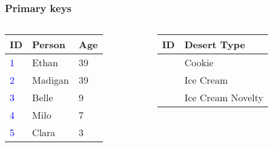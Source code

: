 \documentclass{beamer}
\begin{document}
\begin{frame}
  \frametitle{Primary keys}

  \begin{columns}[T]
    \begin{column}{0.3\textwidth}
      \begin{table}[]
        \footnotesize
        \begin{tabular}{@{}lll@{}}
          \toprule
          ID                  & Person  & Age \\ \midrule
          \textcolor{blue}{1} & Ethan   & 39  \\
          \textcolor{blue}{2} & Madigan & 39  \\
          \textcolor{blue}{3} & Belle   & 9   \\
          \textcolor{blue}{4} & Milo    & 7   \\
          \textcolor{blue}{5} & Clara   & 3   \\ \bottomrule
        \end{tabular}
      \end{table}
    \end{column}
    \begin{column}{0.5\textwidth}
      \begin{table}[]
        \footnotesize
        \begin{tabular}{@{}ll@{}}
          \toprule
          ID              & Desert Type       \\ \midrule
          \color{blue}{1} & Cookie            \\
          \color{blue}{2} & Ice Cream         \\
          \color{blue}{3} & Ice Cream Novelty \\ \bottomrule
        \end{tabular}
      \end{table}
    \end{column}
  \end{columns}


\end{frame}
\end{document}
